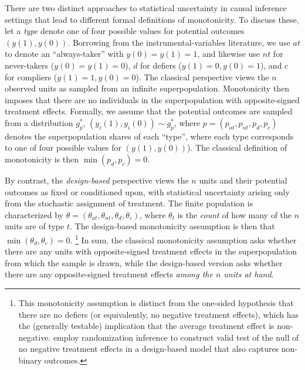 \documentclass[12pt,reqno]{amsart}
\theoremstyle{theorem}
\theoremstyle{definition}
\newcommand{\0}{\mathbf{0}}
\newcommand{\1}{\mathbf{1}}
\begin{document}
There are two distinct approaches to statistical uncertainty in causal inference settings
that lead to different formal definitions of monotonicity. To discuss these, let a \emph{type} denote one of four possible values for potential outcomes $(y(1), y(0))$. Borrowing
from the instrumental-variables literature, we use $at$ to denote an ``always-taker'' with
$y(0)=y(1)=1$, and likewise use $nt$ for never-takers ($y(0)=y(1)=0$), $d$ for defiers ($y(1)=0,y(0)=1$), and $c$ for compliers
($y(1)=1,y(0)=0$). 
The classical perspective views
the $n$ observed units as sampled from an infinite superpopulation. Monotonicity then
imposes that there are no individuals in the superpopulation with opposite-signed
treatment effects. Formally, we assume that the potential outcomes are sampled from a
distribution $g^*_p$, $(y_i(1),y_i(0)) \sim g^*_p$, where $p =
(p_{at},p_{nt},p_{d},p_{c})$ denotes the superpopulation shares of each ``type'', where
each type corresponds to one of four possible values for $(y(1), y(0))$). 
The classical definition of
monotonicity is then $\min(p_d,p_c) =0$.

By contrast, the \emph{design-based} perspective views the $n$ units and their potential
outcomes as {fixed} or conditioned upon, with statistical uncertainty arising only from
the stochastic assignment of treatment. The finite population is characterized by $\theta = (\theta_{at}, \theta_{nt}, \theta_{d}, \theta_{c})$, where $\theta_t$ is the
\emph{count} of how many of the $n$ units are of type $t$. The design-based monotonicity
assumption is then that $\min(\theta_d,\theta_c) = 0$.%
\footnote{This monotonicity assumption is distinct from the one-sided hypothesis that there are no defiers (or equivalently, no negative treatment effects), which has the (generally testable) implication that the average treatment effect is non-negative. \cite{caughey2023randomisation}  employ randomization inference to construct valid test of the null of no negative treatment effects in a design-based model that also captures non-binary outcomes.}
In sum, the classical
monotonicity assumption asks whether there are any units with opposite-signed treatment
effects in the superpopulation from which the sample is drawn, while the design-based
version asks whether there are any opposite-signed treatment effects \emph{among the $n$
units at hand}.
\end{document}

